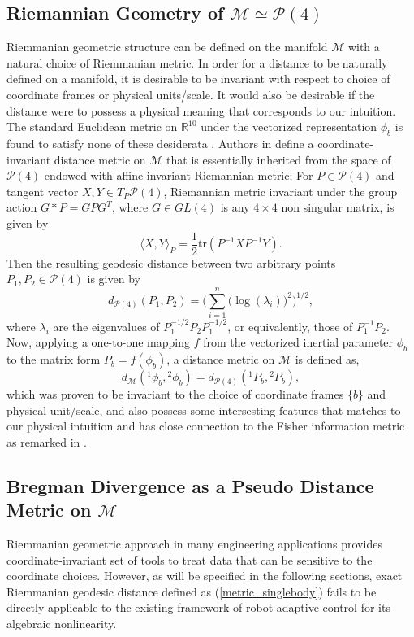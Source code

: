 \documentclass[letterpaper, 10 pt, conference]{ieeeconf}  %
\begin{document}
\subsection{Riemannian Geometry of $\mathcal{M} \simeq \mathcal{P}(4)$ }
Riemmanian geometric structure can be defined on the manifold $\mathcal{M}$ with a natural choice of Riemmanian metric. In order for a distance to be naturally defined on a manifold, it is desirable to be invariant with respect to choice of coordinate frames or physical units/scale. It would also be desirable if the distance were to possess a physical meaning that corresponds to our intuition. The standard Euclidean metric on $\mathbb{R}^{10}$ under the vectorized representation $\phi_{b}$ is found to satisfy none of these desiderata \cite{Taeyoon_RAL}. Authors in \cite{Taeyoon_RAL} define a coordinate-invariant distance metric on $\mathcal{M}$ that is essentially inherited from the space of $\mathcal{P}(4)$ endowed with affine-invariant Riemannian metric; For $P \in \mathcal{P}(4)$ and tangent vector $X, Y \in T_{P}\mathcal{P}(4)$, Riemannian metric invariant under the group action $G * P = GPG^T$, where $G\in GL(4)$ is any $4\times 4$ non singular matrix, is given by
\begin{equation*}
\langle X,Y \rangle_{P} = \frac{1}{2}\mathrm{tr}(P^{-1}XP^{-1}Y).
\label{riem_metric_Pn}
\end{equation*}
Then the resulting geodesic distance between two arbitrary points $P_1, P_2 \in \mathcal{P}(4)$ is given by 
\begin{equation*}
d_{\mathcal{P}(4)}(P_1,P_2) = \bigg(\sum_{i=1}^{n}\big(\log(\lambda_{i})\big)^2\bigg)^{1/2},
\nonumber
\end{equation*}
where $\lambda_i$ are the eigenvalues of $P_{1}^{-1/2}P_{2}P_{1}^{-1/2}$,
or equivalently, those of $P_{1}^{-1}P_{2}$. Now, applying a one-to-one mapping $f$ from the vectorized inertial parameter $\phi_b$ to the matrix form $P_{b} = f(\phi_b)$, a distance metric on $\mathcal{M}$ is defined as,
\begin{equation}
d_{\mathcal{M}}({^{1}}\phi_{b}, {^{2}}\phi_{b})=d_{\mathcal{P}(4)}({^{1}}P_{b}, {^{2}}P_{b}),
\label{metric_singlebody}
\end{equation}
which was proven to be invariant to the choice of coordinate frames $\{b\}$ and physical unit/scale, and also possess some intersesting features that matches to our physical intuition and has close connection to the Fisher information metric as remarked in \cite{Taeyoon_RAL}.

\subsection{Bregman Divergence as a Pseudo Distance Metric on $\mathcal{M}$}
Riemmanian geometric approach in many engineering applications provides coordinate-invariant set of tools to treat data that can be sensitive to the coordinate choices. However, as will be specified in the following sections, exact Riemmanian geodesic distance defined as (\ref{metric_singlebody}) fails to be directly applicable to the existing framework of robot adaptive control for its algebraic nonlinearity.
\end{document}
